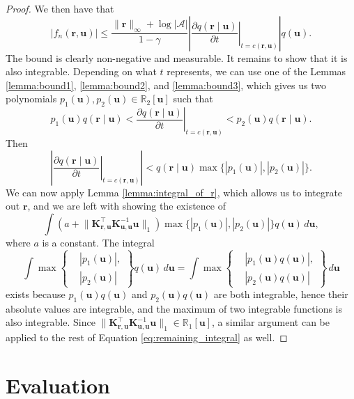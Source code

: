 \documentclass{mpaper}
\newcommand{\vbound}{\frac{\rinf + \log|\mathcal{A}|}{1 - \gamma}}
\newcommand{\rinf}{\lVert \mathbf{r} \rVert_\infty}
\newcommand{\fn}{f_n(\mathbf{r}, \mathbf{u})}
\newcommand{\Kuu}{\mathbf{K}_{\mathbf{u},\mathbf{u}}}
\newcommand{\Kru}{\mathbf{K}_{\mathbf{r},\mathbf{u}}}
\begin{document}
\begin{proof}
  We then have that
  \[
    |\fn| \le \vbound \left| \left. \frac{\partial
          q(\mathbf{r} \mid \mathbf{u})}{\partial t} \right|_{t=c(\mathbf{r}, \mathbf{u})}
    \right| q(\mathbf{u}).
  \]
  The bound is clearly non-negative and measurable. It remains to show that it
  is also integrable. Depending on what $t$ represents, we can use one of the
  Lemmas \ref{lemma:bound1}, \ref{lemma:bound2}, and \ref{lemma:bound3}, which
  gives us two polynomials $p_1(\mathbf{u}), p_2(\mathbf{u}) \in
  \mathbb{R}_2[\mathbf{u}]$ such that
  \[
    p_1(\mathbf{u})q(\mathbf{r} \mid \mathbf{u}) < \left. \frac{\partial q(\mathbf{r} \mid \mathbf{u})}{\partial
        t} \right|_{t=c(\mathbf{r}, \mathbf{u})} < p_2(\mathbf{u})q(\mathbf{r} \mid \mathbf{u}).
  \]
  Then
  \[
    \left| \left. \frac{\partial q(\mathbf{r} \mid \mathbf{u})}{\partial t}
      \right|_{t=c(\mathbf{r}, \mathbf{u})} \right| < q(\mathbf{r} \mid \mathbf{u}) \max \{
    |p_1(\mathbf{u})|, |p_2(\mathbf{u})| \}.
  \]
  We can now apply Lemma \ref{lemma:integral_of_r}, which allows us to integrate
  out $\mathbf{r}$, and we are left with showing the existence of
  \begin{equation} \label{eq:remaining_integral}
    \int \left( a + \lVert \Kru^\intercal \Kuu^{-1} \mathbf{u} \rVert_1 \right) \max \{|p_1(\mathbf{u})|, |p_2(\mathbf{u})| \} q(\mathbf{u})\,d\mathbf{u},
  \end{equation}
  where $a$ is a constant. The integral
  \[
    \int \max \left\{
      \begin{aligned}
        &|p_1(\mathbf{u})|, \\
        &|p_2(\mathbf{u})|
      \end{aligned}
    \right\} q(\mathbf{u})\,d\mathbf{u} = \int \max \left\{
      \begin{aligned}
        &|p_1(\mathbf{u})q(\mathbf{u})|, \\
        &|p_2(\mathbf{u})q(\mathbf{u})|
      \end{aligned}
    \right\}\,d\mathbf{u}
  \]
  exists because $p_1(\mathbf{u})q(\mathbf{u})$ and
  $p_2(\mathbf{u})q(\mathbf{u})$ are both integrable, hence their absolute
  values are integrable, and the maximum of two integrable functions is also
  integrable. Since $\lVert \Kru^\intercal \Kuu^{-1} \mathbf{u} \rVert_1 \in
  \mathbb{R}_1[\mathbf{u}]$, a similar argument can be applied to the rest of
  Equation \ref{eq:remaining_integral} as well.
\end{proof}

\section{Evaluation} %
\end{document}
